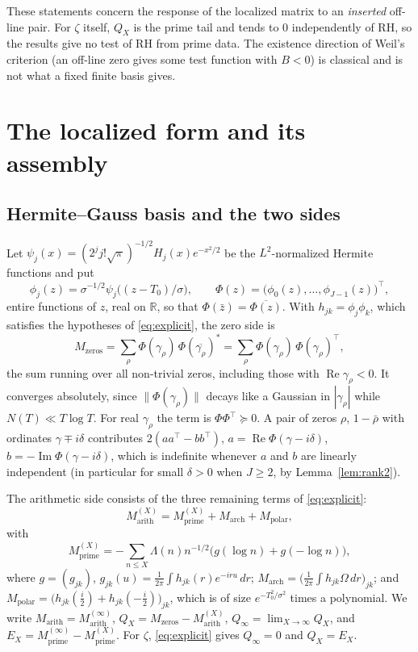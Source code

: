 \documentclass[11pt]{amsart}
\theoremstyle{definition}
\theoremstyle{remark}
\newcommand{\re}{\operatorname{Re}}
\newcommand{\im}{\operatorname{Im}}
\begin{document}
These statements concern the response of the localized matrix to an
\emph{inserted} off-line pair. For $\zeta$ itself, $Q_X$ is the prime tail
and tends to $0$ independently of RH, so the results give no test of RH
from prime data. The existence direction of Weil's criterion (an off-line
zero gives some test function with $B<0$) is classical
\cite{Weil1952,bgBombieriWeil} and is not what a fixed finite basis gives.

\section{The localized form and its assembly}\label{sec:setup}

\subsection{Hermite--Gauss basis and the two sides}

Let $\psi_j(x)=(2^jj!\sqrt\pi)^{-1/2}H_j(x)e^{-x^2/2}$ be the
$L^2$-normalized Hermite functions and put
\[
  \phi_j(z)=\sigma^{-1/2}\psi_j\bigl((z-T_0)/\sigma\bigr),\qquad
  \Phi(z)=\bigl(\phi_0(z),\dots,\phi_{J-1}(z)\bigr)^{\!\top},
\]
entire functions of $z$, real on $\mathbb R$, so that
$\Phi(\bar z)=\overline{\Phi(z)}$. With $h_{jk}=\phi_j\phi_k$, which
satisfies the hypotheses of \eqref{eq:explicit}, the zero side is
\begin{equation}\label{eq:Mzero}
  M_{\mathrm{zeros}} = \sum_{\rho}\Phi(\gamma_\rho)\,\Phi(\overline{\gamma_\rho})^{*}
  =\sum_{\rho}\Phi(\gamma_\rho)\,\Phi(\gamma_\rho)^{\top},
\end{equation}
the sum running over all non-trivial zeros, including those with
$\re\gamma_\rho<0$. It converges absolutely, since
$\|\Phi(\gamma_\rho)\|$ decays like a Gaussian in $|\gamma_\rho|$ while
$N(T)\ll T\log T$. For real $\gamma_\rho$ the term is
$\Phi\Phi^{\top}\succeq0$. A pair of zeros $\rho$, $1-\bar\rho$ with
ordinates $\gamma\mp i\delta$ contributes
$2(aa^{\top}-bb^{\top})$, $a=\re\Phi(\gamma-i\delta)$,
$b=-\im\Phi(\gamma-i\delta)$, which is indefinite whenever $a$ and $b$ are
linearly independent (in particular for small $\delta>0$ when $J\ge2$, by
Lemma~\ref{lem:rank2}).

The arithmetic side consists of the three remaining terms of
\eqref{eq:explicit}:
\begin{equation}\label{eq:Marith}
  M^{(X)}_{\mathrm{arith}} = M_{\mathrm{prime}}^{(X)} + M_{\mathrm{arch}} + M_{\mathrm{polar}},
\end{equation}
with
\[
M^{(X)}_{\mathrm{prime}}=-\sum_{n\le X}\Lambda(n)n^{-1/2}\bigl(g(\log n)+g(-\log n)\bigr),
\]
where $g=(g_{jk})$,
$g_{jk}(u)=\frac1{2\pi}\int h_{jk}(r)e^{-iru}\,dr$;
$M_{\mathrm{arch}}=\bigl(\frac1{2\pi}\int h_{jk}\Omega\,dr\bigr)_{jk}$; and
$M_{\mathrm{polar}}=\bigl(h_{jk}(\tfrac i2)+h_{jk}(-\tfrac i2)\bigr)_{jk}$,
which is of size $e^{-T_0^2/\sigma^2}$ times a polynomial. We write
$M_{\mathrm{arith}}=M^{(\infty)}_{\mathrm{arith}}$,
$Q_X=M_{\mathrm{zeros}}-M^{(X)}_{\mathrm{arith}}$,
$Q_\infty=\lim_{X\to\infty}Q_X$, and
$E_X=M^{(\infty)}_{\mathrm{prime}}-M^{(X)}_{\mathrm{prime}}$. For $\zeta$,
\eqref{eq:explicit} gives $Q_\infty=0$ and $Q_X=E_X$.
\end{document}
